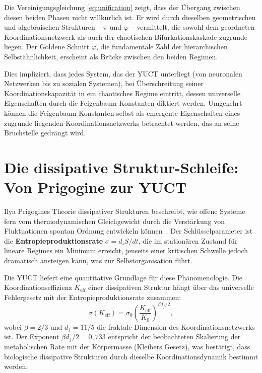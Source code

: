 \documentclass[12pt,a4paper]{article}
\newcommand{\Keff}{K_{\mathrm{eff}}}
\begin{document}
	Die Vereinigungsgleichung \eqref{eq:unification} zeigt, dass der Übergang zwischen diesen beiden Phasen nicht willkürlich ist. Er wird durch dieselben geometrischen und algebraischen Strukturen – \(\pi\) und \(\varphi\) – vermittelt, die sowohl dem geordneten Koordinationsnetzwerk als auch der chaotischen Bifurkationskaskade zugrunde liegen. Der Goldene Schnitt \(\varphi\), die fundamentale Zahl der hierarchischen Selbstähnlichkeit, erscheint als Brücke zwischen den beiden Regimen.
	
	Dies impliziert, dass jedes System, das der YUCT unterliegt (von neuronalen Netzwerken bis zu sozialen Systemen), bei Überschreitung seiner Koordinationskapazität in ein chaotisches Regime eintritt, dessen universelle Eigenschaften durch die Feigenbaum-Konstanten diktiert werden. Umgekehrt können die Feigenbaum-Konstanten selbst als emergente Eigenschaften eines zugrunde liegenden Koordinationsnetzwerks betrachtet werden, das an seine Bruchstelle gedrängt wird.
	
	\section{Die dissipative Struktur-Schleife: Von Prigogine zur YUCT}
	\label{sec:prigogine}
	
	Ilya Prigogines Theorie dissipativer Strukturen beschreibt, wie offene Systeme fern vom thermodynamischen Gleichgewicht durch die Verstärkung von Fluktuationen spontan Ordnung entwickeln können~\cite{Prigogine1977}. Der Schlüsselparameter ist die \textbf{Entropieproduktionsrate} \(\sigma = d_iS/dt\), die im stationären Zustand für lineare Regimes ein Minimum erreicht, jenseits einer kritischen Schwelle jedoch dramatisch ansteigen kann, was zur Selbstorganisation führt.
	
	Die YUCT liefert eine quantitative Grundlage für diese Phänomenologie. Die Koordinationseffizienz \(K_{\mathrm{eff}}\) einer dissipativen Struktur hängt über das universelle Fehlergesetz mit der Entropieproduktionsrate zusammen:
	\begin{equation}
		\sigma(\Keff) = \sigma_0 \left( \frac{\Keff}{K_0} \right)^{\beta d_f / 2},
		\label{eq:sigma-keff}
	\end{equation}
	wobei \(\beta = 2/3\) und \(d_f = 11/5\) die fraktale Dimension des Koordinationsnetzwerks ist. Der Exponent \(\beta d_f / 2 = 0{,}733\) entspricht der beobachteten Skalierung der metabolischen Rate mit der Körpermasse (Kleibers Gesetz), was bestätigt, dass biologische dissipative Strukturen durch dieselbe Koordinationsdynamik bestimmt werden.
	
\end{document}
